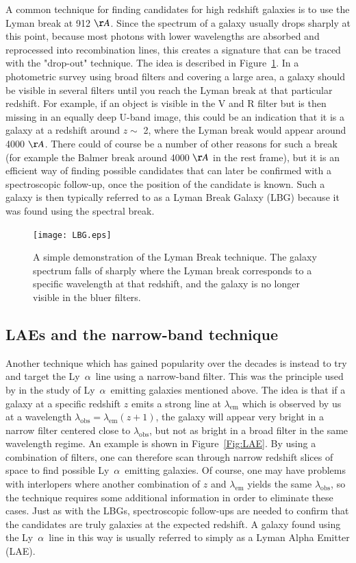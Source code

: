 \documentclass[a4wide,12pt]{book}
\newcommand{\lya}{Ly~${\alpha}$}
\begin{document}
{A common technique for finding candidates for high redshift galaxies is to use the Lyman break at 912 $\AA$. Since the spectrum of a galaxy usually drops sharply at this point, because most photons with lower wavelengths are absorbed and reprocessed into recombination lines, this creates a signature that can be traced with the "drop-out" technique. The idea is described in Figure~\ref{Fig:LBG}. In a photometric survey using broad filters and covering a large area, a galaxy should be visible in several filters until you reach the Lyman break at that particular redshift. For example, if an object is visible in the V and R filter but is then missing in an equally deep U-band image, this could be an indication that it is a galaxy at a redshift around $z \sim$ 2, where the Lyman break would appear around 4000 $\AA$. There could of course be a number of other reasons for such a break (for example the Balmer break around 4000 $\AA$ in the rest frame), but it is an efficient way of finding possible candidates that can later be confirmed with a spectroscopic follow-up, once the position of the candidate is known. Such a galaxy is then typically referred to as a Lyman Break Galaxy (LBG) because it was found using the spectral break.

\begin{figure}
   \centering
   \texttt{[image: LBG.eps]}
   \caption{A simple demonstration of the Lyman Break technique. The galaxy spectrum falls of sharply where the Lyman break corresponds to a specific wavelength at that redshift, and the galaxy is no longer visible in the bluer filters. }
              \label{Fig:LBG}
    \end{figure}

\subsection{LAEs and the narrow-band technique}

Another technique which has gained popularity over the decades is instead to try and target the \lya\ line using a narrow-band filter. This was the principle used by \citet{cowie-hu1998} in the study of \lya\ emitting galaxies mentioned above. The idea is that if a galaxy at a specific redshift $z$ emits a strong line at $\lambda_\mathrm{em}$ which is observed by us at a wavelength $\lambda_\mathrm{obs} = \lambda_\mathrm{em} (z + 1)$, the galaxy will appear very bright in a narrow filter centered close to $\lambda_\mathrm{obs}$, but not as bright in a broad filter in the same wavelength regime. An example is shown in Figure~\ref{Fig:LAE}. By using a combination of filters, one can therefore scan through narrow redshift slices of space to find possible \lya\ emitting galaxies. Of course, one may have problems with interlopers where another combination of $z$ and $\lambda_\mathrm{em}$ yields the same $\lambda_\mathrm{obs}$, so the technique requires some additional information in order to eliminate these cases. Just as with the LBGs, spectroscopic follow-ups are needed to confirm that the candidates are truly galaxies at the expected redshift.
A galaxy found using the \lya\ line in this way is usually referred to simply as a Lyman Alpha Emitter (LAE). 

}
\end{document}
